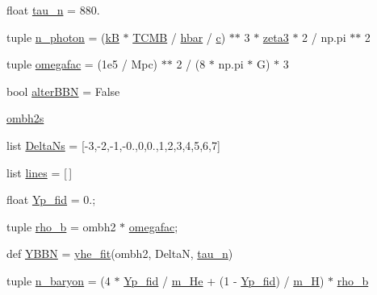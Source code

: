 \begin{DoxyCompactItemize}
\item 
float \mbox{\hyperlink{namespacebbn_a159aaa1465ea9c0555826fa3ea17d3ed}{tau\+\_\+n}} = 880.
\item 
tuple \mbox{\hyperlink{namespacebbn_afb075d5c6ea4d70b7b6b502224ffbac9}{n\+\_\+photon}} = (\mbox{\hyperlink{namespacebbn_ad8b80a31c3103c575ee91606b28c00b6}{kB}} $\ast$ \mbox{\hyperlink{namespacebbn_a45c7b6e0cda690af956e72f58b332e66}{T\+C\+MB}} / \mbox{\hyperlink{namespacebbn_aa4b15a6720cfbfaebb9a8ba90c2d6615}{hbar}} / \mbox{\hyperlink{namespacebbn_ac2a771643cfcc5258e2d0a8d61096152}{c}}) $\ast$$\ast$ 3 $\ast$ \mbox{\hyperlink{namespacebbn_a43d9d2d8599e22e361b96747ee7210fe}{zeta3}} $\ast$ 2 / np.\+pi $\ast$$\ast$ 2
\item 
tuple \mbox{\hyperlink{namespacebbn_a7add864cda923ca0a40fda7711df51d5}{omegafac}} = (1e5 / Mpc) $\ast$$\ast$ 2 / (8 $\ast$ np.\+pi $\ast$ G) $\ast$ 3
\item 
bool \mbox{\hyperlink{namespacebbn_a218e3fff3cfb1735bc090edc24af0ba0}{alter\+B\+BN}} = False
\item 
\mbox{\hyperlink{namespacebbn_abfcfac0d0a6f15787c1f9bf37b990133}{ombh2s}}
\item 
list \mbox{\hyperlink{namespacebbn_a321af84b9281c0021371c705561390e1}{Delta\+Ns}} = \mbox{[}-\/3,-\/2,-\/1,-\/0.,0,0.,1,2,3,4,5,6,7\mbox{]}
\item 
list \mbox{\hyperlink{namespacebbn_a2ac37326174932ddf6ffd8f25c4619a8}{lines}} = \mbox{[}$\,$\mbox{]}
\item 
float \mbox{\hyperlink{namespacebbn_a8b00dee4a160e555ce5c5b347787d15e}{Yp\+\_\+fid}} = 0.;
\item 
tuple \mbox{\hyperlink{namespacebbn_a6a197e513271f0796a8a4e5e2846b34d}{rho\+\_\+b}} = ombh2 $\ast$ \mbox{\hyperlink{namespacebbn_a7add864cda923ca0a40fda7711df51d5}{omegafac}};
\item 
def \mbox{\hyperlink{namespacebbn_a14098dbddadc5e64b5441f3d19aaf7c1}{Y\+B\+BN}} = \mbox{\hyperlink{namespacebbn_a661709a863752020661d412858487224}{yhe\+\_\+fit}}(ombh2, DeltaN, \mbox{\hyperlink{namespacebbn_a159aaa1465ea9c0555826fa3ea17d3ed}{tau\+\_\+n}})
\item 
tuple \mbox{\hyperlink{namespacebbn_a08ca9283eb4fca8cde9e83fc5a201313}{n\+\_\+baryon}} = (4 $\ast$ \mbox{\hyperlink{namespacebbn_a8b00dee4a160e555ce5c5b347787d15e}{Yp\+\_\+fid}} / \mbox{\hyperlink{namespacebbn_a5659e9c09b2847f14bb66c2d73e68191}{m\+\_\+\+He}} + (1 -\/ \mbox{\hyperlink{namespacebbn_a8b00dee4a160e555ce5c5b347787d15e}{Yp\+\_\+fid}}) / \mbox{\hyperlink{namespacebbn_af144f84053152a233d6f7fe2f505589f}{m\+\_\+H}}) $\ast$ \mbox{\hyperlink{namespacebbn_a6a197e513271f0796a8a4e5e2846b34d}{rho\+\_\+b}}
$$
\end{DoxyCompactItemize}
